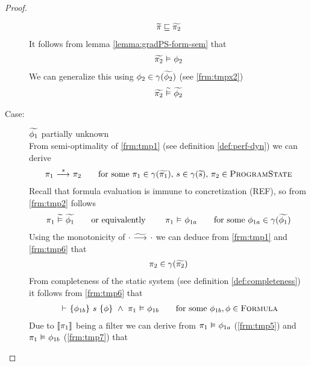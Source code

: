 \begin{proof}
\begin{description}
        \begin{align}
        \label{frm:tmpx7}
        \grad{\pi} \mpt \grad{\pi_2}
        \end{align}
        It follows from lemma \ref{lemma:gradPS-form-sem} that
        \begin{align}
        \label{frm:tmpx8}
        \evalphiGen{\grad{\pi_2}}{\phi_2}
        \end{align}
        We can generalize this using $\phi_2 \in \gamma(\widetilde{\phi_2})$ (see \ref{frm:tmpx2})
        \begin{align}
        \label{frm:tmpx9}
        \evalgphiGen{\grad{\pi_2}}{\grad{\phi_2}}
        \end{align}
    
        \item[Case:] $\widetilde{\phi_1}$ partially unknown~\\
        From semi-optimality of \ref{frm:tmp1} (see definition \ref{def:perf-dyn}) we can derive
        \begin{align}
        \label{frm:tmp6}
        \sstepConsume{s}{\pi_1}{\pi_2}
        \quad\quad\text{for some } \pi_1 \in \gamma(\grad{\pi_1}),\, s \in \gamma(\grad{s}),\, \pi_2 \in \setProgramState
        \end{align}
        Recall that formula evaluation is immune to concretization (REF), so from \ref{frm:tmp2} follows
        \begin{align}
        \label{frm:tmp5}
        \evalgphiGen{\pi_1}{\grad{\phi_1}}
        \text{\quad\quad or equivalently \quad\quad}
        \evalphiGen{\pi_1}{\phi_{1a}}
        \quad\quad\text{for some } \phi_{1a} \in \gamma(\grad{\phi_1}) 
        \end{align}
        Using the monotonicity of ${\cdot} \,\,{\widetilde{\longrightarrow}^{}}\,\, {\cdot}$ we can deduce from \ref{frm:tmp1} and \ref{frm:tmp6} that
        \begin{align}
        \label{frm:tmp6x}
        \pi_2 \in \gamma(\grad{\pi_2})
        \end{align}
        From completeness of the static system (see definition \ref{def:completeness}) it follows from \ref{frm:tmp6} that
        \begin{align}
        \label{frm:tmp7}
        \thoare{}{\phi_{1b}}{s}{\phi} ~\wedge~ \evalphiGen{\pi_1}{\phi_{1b}}
        \quad\quad\text{for some } \phi_{1b}, \phi \in \setFormula
        \end{align}
        Due to $\llbracket {\pi_1} \rrbracket$ being a filter we can derive from $\pi_1 \,\,{\vDash}\,\, \phi_{1a}$ (\ref{frm:tmp5}) and $\pi_1 \,\,{\vDash}\,\, \phi_{1b}$ (\ref{frm:tmp7}) that

\end{description}
\end{proof}
